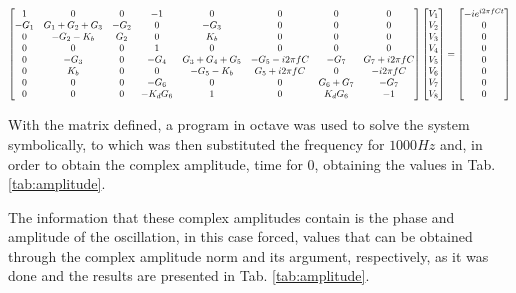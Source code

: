 \begin{equation}
\scalemath{0.8}{
    \begin{bmatrix}
     1 &  0      &  0 &    -1  &     0      &  0  &  0    &  0\\
     -G_1 & G_1+G_2+G_3 & -G_2  & 0   &  -G_3       &  0  &  0    &  0\\
     0   & -G_2-K_b    & G_2  & 0   &   K_b       &  0  &  0    &  0\\
     0   & 0        & 0   & 1 & 0       &  0  & 0   & 0\\
     0   & -G_3      &  0 &  -G_4  &   G_3+G_4+G_5 & -G_5-i 2\pi f C &  -G_7    & G_7+i 2\pi f C\\
     0   & K_b       & 0  &  0    & -G_5-K_b     & G_5+i 2\pi f C  & 0     &  -i 2\pi f C\\
     0   & 0        & 0  & -G_6   &  0         & 0   & G_6+G_7 & -G_7\\
     0   & 0        & 0  &  -K_dG_6    &  1         & 0   & K_dG_6     & -1
    \end{bmatrix} 
    \begin{bmatrix}
       V_1\\
        V_2\\
        V_3\\
        V_4\\
        V_5\\
        V_6\\
        V_7\\
        V_8
    \end{bmatrix}
    =
    \begin{bmatrix}
        -i e^{i 2\pi f C t}\\
        0\\
        0\\
        0\\
        0\\
        0\\
        0\\
        0
    \end{bmatrix}}
\label{eqnodos_forced}
\end{equation}

With the matrix defined, a program in octave was used to solve the system symbolically, to which was then substituted the frequency for $1000 Hz$ and, in order to obtain the complex amplitude, time for $0$, obtaining the values in Tab. \ref{tab:amplitude}.

The information that these complex amplitudes contain is the phase and amplitude of the oscillation, in this case forced, values that can be obtained through the complex amplitude norm and its argument, respectively, as it was done and the results are presented in Tab. \ref{tab:amplitude}.


